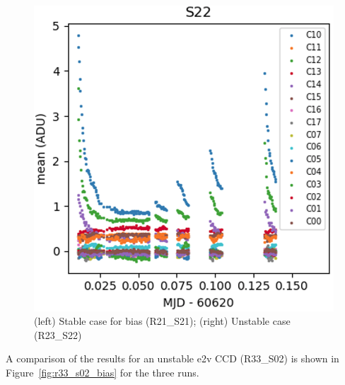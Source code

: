 \begin{figure}[h]
\begin{minipage}[b]{0.45\textwidth}
\includegraphics[width=\textwidth]{sections/figures/E2136_R23_S22.png}
\end{minipage}
\caption{(left) Stable case for bias (R21\_S21); (right) Unstable case (R23\_S22)}
\label{fig:bias-instability}
\end{figure}


A comparison of the results for an unstable e2v CCD (R33\_S02) is shown in Figure~\ref{fig:r33_s02_bias} for the
three runs.

